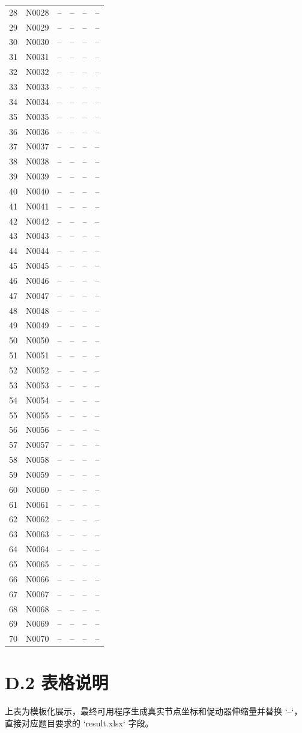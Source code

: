 \begin{longtable}{cccccc}
28 & N0028 & -- & -- & -- & -- \\
29 & N0029 & -- & -- & -- & -- \\
30 & N0030 & -- & -- & -- & -- \\
31 & N0031 & -- & -- & -- & -- \\
32 & N0032 & -- & -- & -- & -- \\
33 & N0033 & -- & -- & -- & -- \\
34 & N0034 & -- & -- & -- & -- \\
35 & N0035 & -- & -- & -- & -- \\
36 & N0036 & -- & -- & -- & -- \\
37 & N0037 & -- & -- & -- & -- \\
38 & N0038 & -- & -- & -- & -- \\
39 & N0039 & -- & -- & -- & -- \\
40 & N0040 & -- & -- & -- & -- \\
41 & N0041 & -- & -- & -- & -- \\
42 & N0042 & -- & -- & -- & -- \\
43 & N0043 & -- & -- & -- & -- \\
44 & N0044 & -- & -- & -- & -- \\
45 & N0045 & -- & -- & -- & -- \\
46 & N0046 & -- & -- & -- & -- \\
47 & N0047 & -- & -- & -- & -- \\
48 & N0048 & -- & -- & -- & -- \\
49 & N0049 & -- & -- & -- & -- \\
50 & N0050 & -- & -- & -- & -- \\
51 & N0051 & -- & -- & -- & -- \\
52 & N0052 & -- & -- & -- & -- \\
53 & N0053 & -- & -- & -- & -- \\
54 & N0054 & -- & -- & -- & -- \\
55 & N0055 & -- & -- & -- & -- \\
56 & N0056 & -- & -- & -- & -- \\
57 & N0057 & -- & -- & -- & -- \\
58 & N0058 & -- & -- & -- & -- \\
59 & N0059 & -- & -- & -- & -- \\
60 & N0060 & -- & -- & -- & -- \\
61 & N0061 & -- & -- & -- & -- \\
62 & N0062 & -- & -- & -- & -- \\
63 & N0063 & -- & -- & -- & -- \\
64 & N0064 & -- & -- & -- & -- \\
65 & N0065 & -- & -- & -- & -- \\
66 & N0066 & -- & -- & -- & -- \\
67 & N0067 & -- & -- & -- & -- \\
68 & N0068 & -- & -- & -- & -- \\
69 & N0069 & -- & -- & -- & -- \\
70 & N0070 & -- & -- & -- & -- \\
\bottomrule
\end{longtable}
\normalsize

\section*{D.2 表格说明}
上表为模板化展示，最终可用程序生成真实节点坐标和促动器伸缩量并替换 `--`，直接对应题目要求的 `result.xlsx` 字段。
